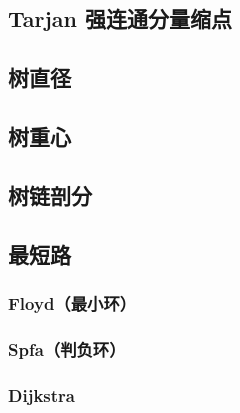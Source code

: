 \documentclass{article}
\begin{document}


\subsection{Tarjan 强连通分量缩点}



\subsection{树直径}



\subsection{树重心}



\subsection{树链剖分}



\subsection{最短路}

\subsubsection{Floyd（最小环）}



\subsubsection{Spfa（判负环）}



\subsubsection{Dijkstra}


\end{document}

